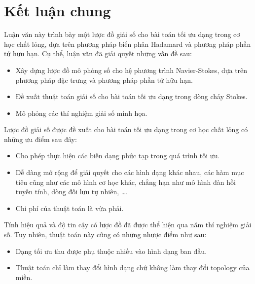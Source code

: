 \chapter*{\centering Kết luận chung} %

Luận văn này trình bày một lược đồ giải số cho bài toán tối ưu dạng trong cơ học chất lỏng, dựa trên phương pháp biến phân Hadamard và phương pháp phần tử hữu hạn. Cụ thể, luận văn đã giải quyết những vấn đề sau:
\begin{itemize}
\item Xây dựng lược đồ mô phỏng số cho hệ phương trình Navier-Stokes, dựa trên phương pháp đặc trưng và phương pháp phần tử hữu hạn.
\item Đề xuất thuật toán giải số cho bài toán tối ưu dạng trong dòng chảy Stokes.
\item Mô phỏng các thí nghiệm giải số minh họa.
\end{itemize}

Lược đồ giải số được đề xuất cho bài toán tối ưu dạng trong cơ học chất lỏng có những ưu điểm sau đây:
\begin{itemize}
\item Cho phép thực hiện các biến dạng phức tạp trong quá trình tối ưu.
\item Dễ dàng mở rộng để giải quyết cho các hình dạng khác nhau, các hàm mục tiêu cũng như các mô hình cơ học khác, chẳng hạn như mô hình đàn hồi tuyến tính, dòng đối lưu tự nhiên, \ldots.
\item Chi phí của thuật toán là vừa phải.
\end{itemize}

Tính hiệu quả và độ tin cậy có lược đồ đã được thể hiện qua năm thí nghiệm giải số. Tuy nhiên, thuật toán này cũng có những nhược điểm như sau:
\begin{itemize}
\item Dạng tối ưu thu được phụ thuộc nhiều vào hình dạng ban đầu. 
\item Thuật toán chỉ làm thay đổi hình dạng chứ không làm thay đổi topology của miền.
\end{itemize} 

